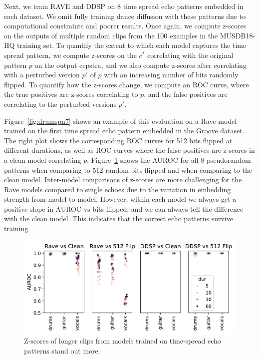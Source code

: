 \documentclass[letterpaper]{article} %
\begin{document}
Next, we train RAVE and DDSP on 8 time spread echo patterns embedded in each dataset.  We omit fully training dance diffusion with these patterns due to computational constraints and poorer results.  Once again, we compute z-scores on the outputs of multiple random clips from the 100 examples in the MUSDB18-HQ training set.  To quantify the extent to which each model captures the time spread pattern, we compute z-scores on the $c^*$ correlating with the original pattern $p$ on the output cepstra, and we also compute z-scores after correlating with a perturbed version $p'$ of $p$ with an increasing number of bits randomly flipped.  To quantify how the z-scores change, we compute an ROC curve, where the true positives are z-scores correlating to $p$, and the false positives are correlating to the perturbed versions $p'$.  


Figure~\ref{fig:drumspn7} shows an example of this evaluation on a Rave model trained on the first time spread echo pattern embedded in the Groove dataset.  The right plot shows the corresponding ROC curves for 512 bits flipped at different durations, as well as ROC curves where the false positives are z-scores in a clean model correlating $p$.  Figure~\ref{fig:pneval} shows the AUROC for all 8 pseudorandom patterns when comparing to 512 random bits flipped and when comparing to the clean model.  Inter-model comparisons of z-scores are more challenging for the Rave models compared to single echoes due to the variation in embedding strength from model to model.   However, within each model we always get a positive slope in AUROC vs bits flipped, and we can always tell the difference with the clean model.  This indicates that the correct echo patterns survive training.


\begin{figure}
    \centering
    \includegraphics[width=\columnwidth]{figs/PNEval.pdf}
    \caption{Z-scores of longer clips from models trained on time-spread echo patterns stand out more.}
    \label{fig:pneval}
\end{figure}
\end{document}
